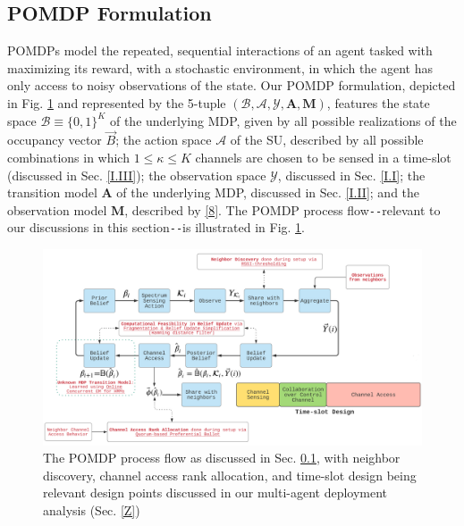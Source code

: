 \documentclass[12pt, draftcls, onecolumn]{IEEEtran}
\begin{document}
\subsection{POMDP Formulation}\label{II.0}
POMDPs model the repeated, sequential interactions of an agent tasked with maximizing its reward, with a stochastic environment, in which the agent has only access to noisy observations of the state. Our POMDP formulation, depicted in Fig. \ref{fig: A.add-1} and
represented by the 5-tuple $(\mathcal{B},\mathcal{A},\mathcal{Y},\mathbf{A},\mathbf{M})$, features the state space $\mathcal{B}{\equiv}\{0,1\}^{K}$ of the underlying MDP, given by all possible realizations of the occupancy vector $\vec{B}$; the action space $\mathcal{A}$ of the SU, described by all possible combinations in which $1{\leq}\kappa{\leq}K$ channels are chosen to be sensed in a time-slot (discussed in Sec. \ref{I.III}); the observation space $\mathcal{Y}$, discussed in Sec. \ref{I.I}; the transition model $\mathbf{A}$ of the underlying MDP, discussed in Sec. \ref{I.II}; and the observation model $\mathbf{M}$, described by \eqref{8}. The POMDP process flow\texttt{-{}-}relevant to our discussions in this section\texttt{-{}-}is illustrated in Fig. \ref{fig: A.add-1}.
\begin{figure} [t]
    \centerline{
    \includegraphics[width=0.8\linewidth]{figures/POMDP_MultiAgent_Model.PNG}}
    \vspace{-6mm}
    \caption{The POMDP process flow as discussed in Sec. \ref{II.0}, with neighbor discovery, channel access rank allocation, and time-slot design being relevant design points discussed in our multi-agent deployment analysis (Sec. \ref{Z})}
    \vspace{-7mm}
    \label{fig: A.add-1}
\end{figure}
\end{document}
